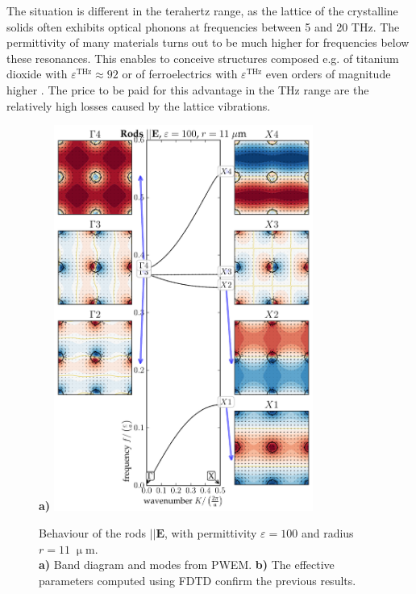 {{The situation is different in the terahertz range, as the lattice of the crystalline solids often exhibits optical phonons at frequencies between 5 and 20 THz. The permittivity of many materials turns out to be much higher for frequencies below these resonances. This enables to conceive structures composed e.g. of titanium dioxide \cite{baumard1977_epsilon_TiO2} with $\varepsilon^{\text{THz}} \approx 92$ or of ferroelectrics with $\varepsilon^{\text{THz}}$ even orders of magnitude higher \cite{skoromets2011tuning}. The price to be paid for this advantage in the THz range are the relatively high losses caused by the lattice vibrations.
}

\begin{figure}[ht] \caption{Behaviour of the rods $||\mathbf E$, with permittivity $\varepsilon = 100$ and radius $r=11\;\upmu$m.\\
\textbf{a)} Band diagram and modes from PWEM. 
\textbf{b)} The effective parameters computed using FDTD confirm the previous results.  } \label{fg_erod_radius11} \centering 
\textbf{a)}	\includegraphics[width=8.5cm]{img/ERods_eps100_R11_PWEM.pdf}

\end{figure}}
